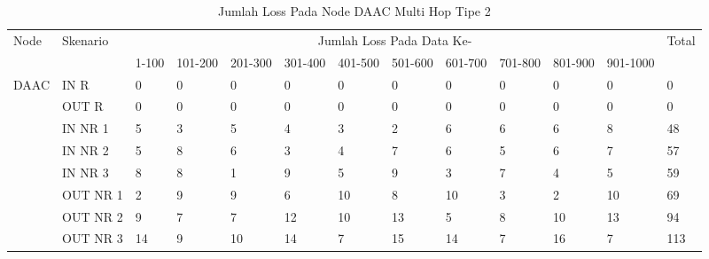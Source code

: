 \begin{table}[H]
  \centering
  \caption{Jumlah Loss Pada Node DAAC Multi Hop Tipe 2}
    \begin{tabular}{|p{1cm}|p{1.9cm}|p{0.6cm}|p{0.6cm}|p{0.6cm}|p{0.6cm}|p{0.6cm}|p{0.6cm}|p{0.6cm}|p{0.6cm}|p{0.6cm}|p{0.6cm}|p{1cm}|}
    \hline
        \multirow{2}{*}{Node}&\multirow{2}{*}{Skenario}&\multicolumn{10}{|c|}{Jumlah Loss Pada Data Ke-}&\multirow{2}{*}{Total} \\\cline{3-12}
          & & 1-100 & 101-200 & 201-300 & 301-400 & 401-500 & 501-600 & 601-700 & 701-800 & 801-900 & 901-1000 & \\
        \hline
    \multirow{8}{*}{DAAC}  
    & IN R  & 0     & 0     & 0     & 0     & 0     & 0     & 0     & 0     & 0     & 0     & 0 \\
          & OUT R & 0     & 0     & 0     & 0     & 0     & 0     & 0     & 0     & 0     & 0     & 0 \\
          & IN NR 1 & 5     & 3     & 5     & 4     & 3     & 2     & 6     & 6     & 6     & 8     & 48 \\
          & IN NR 2 & 5     & 8     & 6     & 3     & 4     & 7     & 6     & 5     & 6     & 7     & 57 \\
          & IN NR 3 & 8     & 8     & 1     & 9     & 5     & 9     & 3     & 7     & 4     & 5     & 59 \\
          & OUT NR 1 & 2     & 9     & 9     & 6     & 10    & 8     & 10    & 3     & 2     & 10    & 69 \\
          & OUT NR 2 & 9     & 7     & 7     & 12    & 10    & 13    & 5     & 8     & 10    & 13    & 94 \\
          & OUT NR 3 & 14    & 9     & 10    & 14    & 7     & 15    & 14    & 7     & 16    & 7     & 113 \\
        
    
    \hline
    \end{tabular}%
  \label{tab:addlabel}%
\end{table}%
